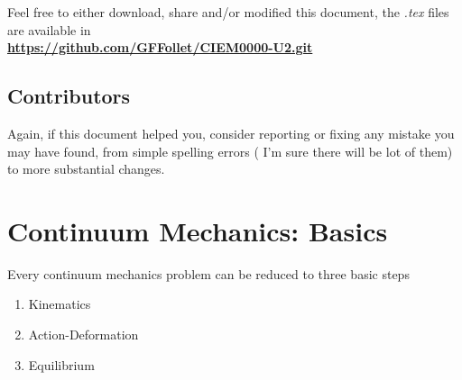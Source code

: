 \documentclass[a4paper, 11pt,article,oneside]{memoir}%
\begin{document}
Feel free to either download, share and/or modified this document, the \textit{.tex} files are available  in\\ \textbf{{\color{magenta}\href{https://github.com/GFFollet/CIEM0000-U2.git}{https://github.com/GFFollet/CIEM0000-U2.git}}}
\section*{Contributors}
Again, if this document helped you, consider reporting or fixing any mistake you may have found, from simple spelling errors ( I'm sure there will be  lot of them) to more substantial changes.

\newpage
\tableofcontents
\newpage



\chapter{Continuum Mechanics: Basics}
Every continuum mechanics problem can be reduced to three basic steps

\begin{enumerate}
\item Kinematics
\item Action-Deformation
\item Equilibrium
\end{enumerate}
	
\end{document}
